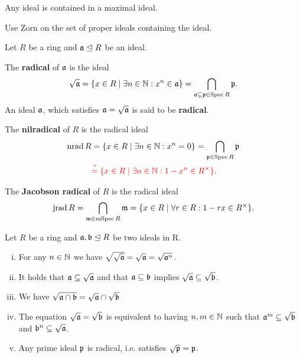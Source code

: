 	\begin{lemma}
		Any ideal is contained in a maximal ideal.
	\end{lemma}
	\begin{sketch}
		Use Zorn on the set of proper ideals containing the ideal.
	\end{sketch}

	\begin{definition}
		Let $R$ be a ring and $\mathfrak{a} \trianglelefteq R$ be an ideal. 

		The \textbf{radical} of $\mathfrak{a}$ is the ideal 
		\begin{equation*}
			\sqrt{\mathfrak{a}} = \{x \in R \mid \exists n \in \mathbb{N}: x^n \in \mathfrak{a}\} = \bigcap \limits_{\mathfrak{a} \subseteq \mathfrak{p} \in \operatorname{Spec} R} \mathfrak{p}.
		\end{equation*}
		An ideal $\mathfrak{a}$, which satisfies $\mathfrak{a} = \sqrt{\mathfrak{a}}$ is said to be \textbf{radical}.

		The \textbf{nilradical} of $R$ is the radical ideal
		\begin{align*}
			\operatorname{nrad} R &= \{x \in R \mid \exists n \in \mathbb{N}: x^n = 0\} = \bigcap \limits_{\mathfrak{p} \in \operatorname{Spec} R} \mathfrak{p}\\
			& \textcolor{red}{\overset{?}{=} \{x \in R \mid \exists n \in \mathbb{N}: 1 - x^n \in R^\times\}}.
		\end{align*}

		The \textbf{Jacobson radical} of $R$ is the radical ideal
		\begin{equation*}
			\operatorname{jrad} R = \bigcap \limits_{\mathfrak{m} \in \operatorname{mSpec} R} \mathfrak{m} = \{x \in R \mid \forall r \in R: 1 - rx \in R^\times\}.
		\end{equation*}
	\end{definition}

	\begin{lemma}
		Let $R$ be a ring and $\mathfrak{a},\mathfrak{b} \trianglelefteq R$ be two ideals in R.
		\begin{enumerate}[(i)]
			\item{
				For any $n \in \mathbb{N}$ we have $\sqrt{\sqrt{\mathfrak{a}}} = \sqrt{\mathfrak{a}} = \sqrt{\mathfrak{a}^n}$.
			}
			\item{
				It holds that $\mathfrak{a} \subseteq \sqrt{\mathfrak{a}}$ and that $\mathfrak{a} \subseteq \mathfrak{b}$ implies $\sqrt{\mathfrak{a}} \subseteq \sqrt{\mathfrak{b}}$.
			}
			\item{
				We have $\sqrt{\mathfrak{a} \cap \mathfrak{b}} = \sqrt{\mathfrak{a}} \cap \sqrt{\mathfrak{b}}$
			}
			\item{
				The equation $\sqrt{\mathfrak{a}} = \sqrt{\mathfrak{b}}$ is equivalent to having $n,m \in \mathbb{N}$ such that $\mathfrak{a}^m \subseteq \sqrt{\mathfrak{b}}$ and $\mathfrak{b}^n \subseteq \sqrt{\mathfrak{a}}$.
			}
			\item{
				Any prime ideal $\mathfrak{p}$ is radical, i.e. satisfies $\sqrt{\mathfrak{p}} = \mathfrak{p}$.
			}
		\end{enumerate}
	\end{lemma}

